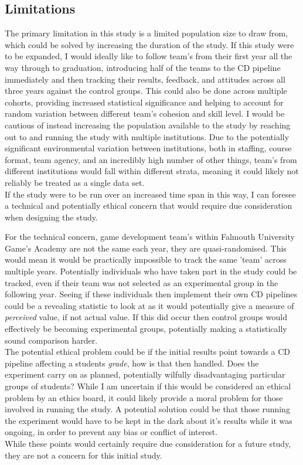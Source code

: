 \documentclass[lettersize,journal]{IEEEtran}
\begin{document}
    \subsection{Limitations}
        The primary limitation in this study is a limited population size to draw from, which could be solved by increasing the duration of the study. If this study were to be expanded, I would ideally like to follow team's from their first year all the way through to graduation, introducing half of the teams to the CD pipeline immediately and then tracking their results, feedback, and attitudes across all three years against the control groups. This could also be done across multiple cohorts, providing increased statistical significance and helping to account for random variation between different team's cohesion and skill level. I would be cautious of instead increasing the population available to the study by reaching out to and running the study with multiple institutions. Due to the potentially significant environmental variation between institutions, both in staffing, course format, team agency, and an incredibly high number of other things, team's from different institutions would fall within different strata, meaning it could likely not reliably be treated as a single data set. \\
        If the study were to be run over an increased time span in this way, I can foresee a technical and potentially ethical concern that would require due consideration when designing the study.
        
        For the technical concern, game development team's within Falmouth University Game's Academy are not the same each year, they are quasi-randomised. This would mean it would be practically impossible to track the same 'team' across multiple years. Potentially individuals who have taken part in the study could be tracked, even if their team was not selected as an experimental group in the following year. Seeing if these individuals then implement their own CD pipelines could be a revealing statistic to look at as it would potentially give a measure of \textit{perceived} value, if not actual value. If this did occur then control groups would effectively be becoming experimental groups, potentially making a statistically sound comparison harder. \\
        The potential ethical problem could be if the initial results point towards a CD pipeline affecting a students \textit{grade}, how is that then handled. Does the experiment carry on as planned, potentially wilfully disadvantaging particular groups of students? While I am uncertain if this would be considered an ethical problem by an ethics board, it could likely provide a moral problem for those involved in running the study. A potential solution could be that those running the experiment would have to be kept in the dark about it's results while it was ongoing, in order to prevent any bias or conflict of interest. \\
        While these points would certainly require due consideration for a future study, they are not a concern for this initial study.
\end{document}
